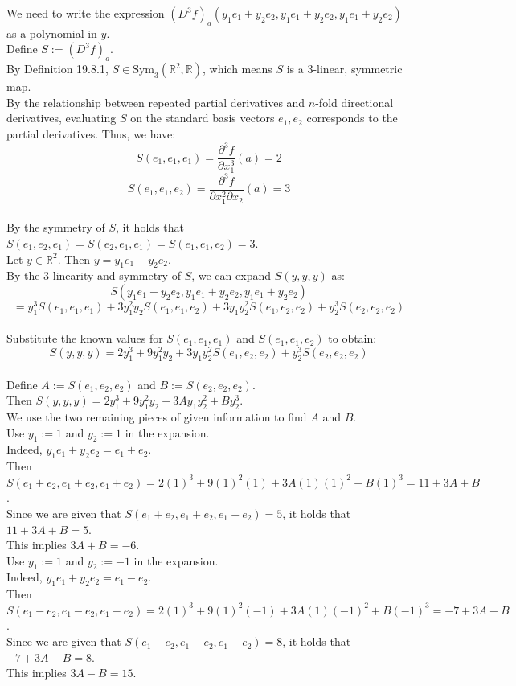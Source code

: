 \documentclass[11pt,a4paper]{article}
\theoremstyle{definition}
\theoremstyle{plain}
\theoremstyle{remark}
\begin{document}
\noindent We need to write the expression $(D^3f)_a(y_1 e_1 + y_2 e_2, y_1 e_1 + y_2 e_2, y_1 e_1 + y_2 e_2)$ as a polynomial in $y$.\\
Define $S := (D^3f)_a$.\\
By Definition 19.8.1, $S \in \text{Sym}_3(\mathbb{R}^2, \mathbb{R})$, which means $S$ is a 3-linear, symmetric map.\\
By the relationship between repeated partial derivatives and $n$-fold directional derivatives, evaluating $S$ on the standard basis vectors $e_1, e_2$ corresponds to the partial derivatives. Thus, we have:
$$S(e_1, e_1, e_1) = \frac{\partial^3 f}{\partial x_1^3}(a) = 2$$
$$S(e_1, e_1, e_2) = \frac{\partial^3 f}{\partial x_1^2 \partial x_2}(a) = 3$$\\
By the symmetry of $S$, it holds that $S(e_1, e_2, e_1) = S(e_2, e_1, e_1) = S(e_1, e_1, e_2) = 3$.\\
Let $y \in \mathbb{R}^2$. Then $y = y_1e_1 + y_2e_2$.\\
By the 3-linearity and symmetry of $S$, we can expand $S(y, y, y)$ as:\\
$$S(y_1e_1 + y_2e_2, y_1e_1 + y_2e_2, y_1e_1 + y_2e_2)$$
$$= y_1^3 S(e_1, e_1, e_1) + 3y_1^2 y_2 S(e_1, e_1, e_2) + 3y_1 y_2^2 S(e_1, e_2, e_2) + y_2^3 S(e_2, e_2, e_2)$$\\
Substitute the known values for $S(e_1, e_1, e_1)$ and $S(e_1, e_1, e_2)$ to obtain:
$$S(y, y, y) = 2y_1^3 + 9y_1^2 y_2 + 3y_1 y_2^2 S(e_1, e_2, e_2) + y_2^3 S(e_2, e_2, e_2)$$\\
Define $A := S(e_1, e_2, e_2)$ and $B := S(e_2, e_2, e_2)$.\\
Then $S(y, y, y) = 2y_1^3 + 9y_1^2 y_2 + 3A y_1 y_2^2 + B y_2^3$.\\
We use the two remaining pieces of given information to find $A$ and $B$.\\
Use $y_1 := 1$ and $y_2 := 1$ in the expansion. \\
Indeed, $y_1e_1 + y_2e_2 = e_1 + e_2$.\\
Then $S(e_1+e_2, e_1+e_2, e_1+e_2) = 2(1)^3 + 9(1)^2(1) + 3A(1)(1)^2 + B(1)^3 = 11 + 3A + B$.\\
Since we are given that $S(e_1+e_2, e_1+e_2, e_1+e_2) = 5$, it holds that $11 + 3A + B = 5$.\\
This implies $3A + B = -6$.\\

\noindent Use $y_1 := 1$ and $y_2 := -1$ in the expansion. \\
Indeed, $y_1e_1 + y_2e_2 = e_1 - e_2$.\\
Then $S(e_1-e_2, e_1-e_2, e_1-e_2) = 2(1)^3 + 9(1)^2(-1) + 3A(1)(-1)^2 + B(-1)^3 = -7 + 3A - B$.\\
Since we are given that $S(e_1-e_2, e_1-e_2, e_1-e_2) = 8$, it holds that $-7 + 3A - B = 8$.\\
This implies $3A - B = 15$.\\
\end{document}
